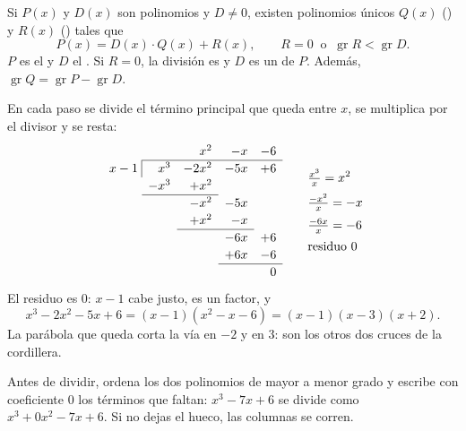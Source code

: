 \documentclass[11pt,a4paper]{article}
\makeatletter
\newcommand{\gr}{\operatorname{gr}}
\newcommand{\nb}{\multicolumn{1}{r@{\;}}{}}
\makeatother
\begin{document}
\begin{definicion}
Si $P(x)$ y $D(x)$ son polinomios y $D\neq 0$, existen polinomios únicos $Q(x)$ () y $R(x)$
() tales que
\[ P(x)=D(x)\cdot Q(x)+R(x),\qquad R=0\ \text{ o }\ \gr R<\gr D . \]
$P$ es el  y $D$ el . Si $R=0$, la división es  y $D$ es un
 de $P$. Además, $\gr Q=\gr P-\gr D$.
\end{definicion}

\begin{ejemplo}
En cada paso se divide el término principal que queda entre $x$, se multiplica por el divisor y se resta:
\[
\renewcommand{\arraystretch}{1.15}
\begin{array}{r@{\;}|rrrr}
\nb & & x^2 & -x & -6\\ \cline{2-5}
x-1 & x^3 & -2x^2 & -5x & +6\\
\nb & -x^3 & +x^2 & & \\ \cline{2-3}
\nb & & -x^2 & -5x & \\
\nb & & +x^2 & -x & \\ \cline{3-4}
\nb & & & -6x & +6\\
\nb & & & +6x & -6\\ \cline{4-5}
\nb & & & & 0
\end{array}
\qquad
\begin{aligned}
&\tfrac{x^3}{x}=x^2\\[2pt]
&\tfrac{-x^2}{x}=-x\\[2pt]
&\tfrac{-6x}{x}=-6\\[2pt]
&\text{residuo } 0
\end{aligned}
\]
El residuo es $0$: $x-1$ cabe justo, es un factor, y
\[ x^3-2x^2-5x+6=(x-1)\left(x^2-x-6\right)=(x-1)(x-3)(x+2). \]
La parábola que queda corta la vía en $-2$ y en $3$: son los otros dos cruces de la cordillera.
\end{ejemplo}

\begin{ojo}
Antes de dividir, ordena los dos polinomios de mayor a menor grado y escribe con coeficiente $0$ los términos que
faltan: $x^3-7x+6$ se divide como $x^3+0x^2-7x+6$. Si no dejas el hueco, las columnas se corren.
\end{ojo}
\end{document}
